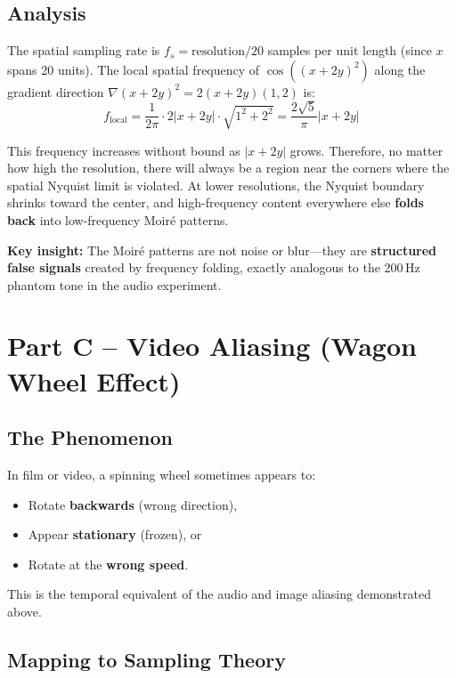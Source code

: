 \documentclass[12pt, a4paper]{article}
\begin{document}
\subsection{Analysis}

The spatial sampling rate is $f_s = \text{resolution} / 20$ samples per unit length (since $x$ spans 20 units). The local spatial frequency of $\cos((x+2y)^2)$ along the gradient direction $\nabla(x+2y)^2 = 2(x+2y)(1, 2)$ is:
\begin{equation}
    f_{\text{local}} = \frac{1}{2\pi} \cdot 2|x + 2y| \cdot \sqrt{1^2 + 2^2} = \frac{2\sqrt{5}}{\pi}|x + 2y|
\end{equation}

This frequency increases without bound as $|x + 2y|$ grows. Therefore, no matter how high the resolution, there will always be a region near the corners where the spatial Nyquist limit is violated. At lower resolutions, the Nyquist boundary shrinks toward the center, and high-frequency content everywhere else \textbf{folds back} into low-frequency Moir\'{e} patterns.

\textbf{Key insight:} The Moir\'{e} patterns are not noise or blur---they are \textbf{structured false signals} created by frequency folding, exactly analogous to the 200\,Hz phantom tone in the audio experiment.

\section{Part C -- Video Aliasing (Wagon Wheel Effect)}

\subsection{The Phenomenon}

In film or video, a spinning wheel sometimes appears to:
\begin{itemize}
    \item Rotate \textbf{backwards} (wrong direction),
    \item Appear \textbf{stationary} (frozen), or
    \item Rotate at the \textbf{wrong speed}.
\end{itemize}
This is the temporal equivalent of the audio and image aliasing demonstrated above.

\subsection{Mapping to Sampling Theory}
\end{document}
